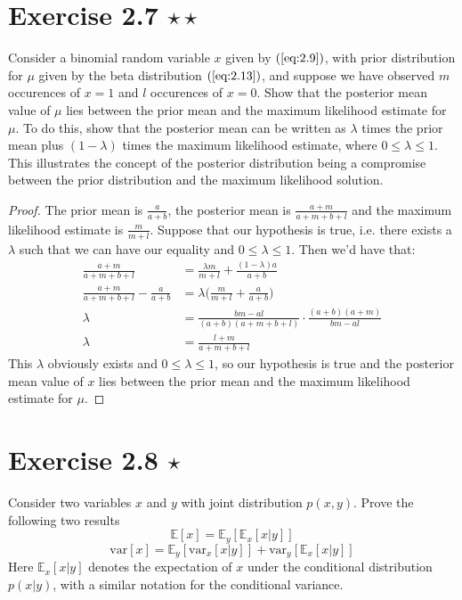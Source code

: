 \section*{Exercise 2.7 $\star \star$}
Consider a binomial random variable $x$ given by $(\ref{eq:2.9})$, with
prior distribution for $\mu$ given by the beta distribution $(\ref{eq:2.13})$,
and suppose we have observed $m$ occurences of $x=1$ and $l$ occurences 
of $x=0$. Show that the posterior mean value of $\mu$ lies between the prior
mean and the maximum likelihood estimate for $\mu$. To do this,
show that the posterior mean can be written as $\lambda$ times the prior
mean plus $(1 - \lambda)$ times the maximum likelihood estimate, 
where  $0 \leq \lambda \leq 1$. This illustrates the concept of
the posterior distribution being a compromise between the prior
distribution and the maximum likelihood solution.

\begin{proof}
    The prior mean is $\displaystyle \frac{a}{a + b}$, the posterior mean is 
    $\displaystyle \frac{a + m}{a + m + b + l}$ and the maximum likelihood 
    estimate is $\displaystyle \frac{m}{m + l}$. Suppose that our hypothesis
    is true, i.e. there exists a $\lambda$ such that we can have our equality
    and $0 \leq \lambda \leq 1$. Then we'd have that:
    \begin{align*}
        \frac{a + m}{a + m + b + l} &= \frac{\lambda m}{m + l} + \frac{(1 - \lambda)a}{a + b} \\
        \frac{a + m}{a + m + b + l} - \frac{a}{a + b} &= \lambda\bigg(\frac{m}{m + l} + \frac{a}{a + b}\bigg) \\
        \lambda &= \frac{bm - al}{(a + b)(a + m + b + l)} \cdot \frac{(a + b)(a + m)}{bm - al} \\
        \lambda &= \frac{l + m}{a + m + b + l}
    \end{align*}
    This $\lambda$ obviously exists and $0 \leq \lambda \leq 1$, so our hypothesis is
    true and the posterior mean value of $x$ lies between the prior mean
    and the maximum likelihood estimate for $\mu$.
\end{proof}

\section*{Exercise 2.8 $\star$}
Consider two variables $x$ and $y$ with joint distribution $p(x, y)$.
Prove the following two results
\begin{equation}\label{eq:2.270}\tag{2.270}
    \mathbb{E}[x] = \mathbb{E}_y[\mathbb{E}_x[x | y]]
\end{equation}
\vspace{-1em}
\begin{equation}\label{eq:2.271}\tag{2.271}
    \text{var}[x] = \mathbb{E}_y[\text{var}_x[x | y]] + \text{var}_y[\mathbb{E}_x[x|y]]
\end{equation}
Here $\mathbb{E}_x[x | y]$ denotes the expectation of $x$ under the conditional
distribution $p(x | y)$, with a similar notation for the conditional
variance.

